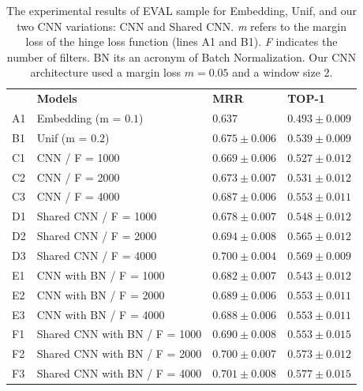 \documentclass[sigconf]{acmart}
\begin{document}
\begin{table}[t]
\centering
\begin{tabular}{ p{1cm} p{6cm} >{\raggedleft\arraybackslash}p{4cm} >{\raggedleft\arraybackslash}p{4cm} }
 \hline
    & & \multicolumn{2}{c}{\textbf{Results}}\\
 \hline
 & \textbf{Models} & \textbf{MRR} & \textbf{TOP-1}\\
 \hline
 A1 & Embedding (m = $0.1$) & $0.637$& $0.493 \pm 0.009$\\
 
 \hline
 
 B1 & Unif (m = $0.2$) & $0.675 \pm 0.006$ & $0.539 \pm 0.009$\\
 
 \hline
 
 C1 & CNN / F = 1000 & $0.669 \pm 0.006$ & $0.527 \pm 0.012$\\
 
 C2 & CNN / F = 2000 & $0.673 \pm 0.007$ & $0.531 \pm 0.012$\\
 
 C3 & CNN / F = 4000 & $0.687 \pm 0.006$ & $0.553 \pm 0.011$\\
 
 \hline
 
 D1 & Shared CNN / F = 1000 & $0.678 \pm 0.007$ & $0.548 \pm 0.012$\\
 
 D2 & Shared CNN / F = 2000 & $0.694 \pm 0.008$ & $0.565 \pm 0.012$\\
 
 D3 & Shared CNN / F = 4000 & $0.700 \pm 0.004$ & $0.569 \pm 0.009$\\
 
 \hline
 
 E1 & CNN with BN / F = 1000 & $0.682 \pm 0.007$ & $0.543 \pm 0.012$\\
 
 E2 & CNN with BN / F = 2000 & $0.689 \pm 0.006$ & $0.553 \pm 0.011$\\
 
 E3 & CNN with BN / F = 4000 & $0.688 \pm 0.006$ & $0.553 \pm 0.011$\\
 
 \hline
 
 F1 & Shared CNN with BN / F = 1000 & $0.690 \pm 0.008$ & $0.553 \pm 0.015$\\
 
 F2 & Shared CNN with BN / F = 2000 & $0.700 \pm 0.007$ & $0.573 \pm 0.012$\\
 
 F3 & Shared CNN with BN / F = 4000 & $0.701 \pm 0.008$ & $0.577 \pm 0.015$\\
 
\hline
\end{tabular}
\caption{The experimental results of EVAL sample for Embedding, Unif, and our two CNN variations: CNN and Shared CNN. \emph{m} refers to the margin loss of the hinge loss function (lines A1 and B1). \emph{F} indicates the number of filters. BN its an acronym of Batch Normalization. Our CNN architecture used a margin loss $m = 0.05$ and a window size $2$.}
\label{table:resultados}
\end{table}
\end{document}
